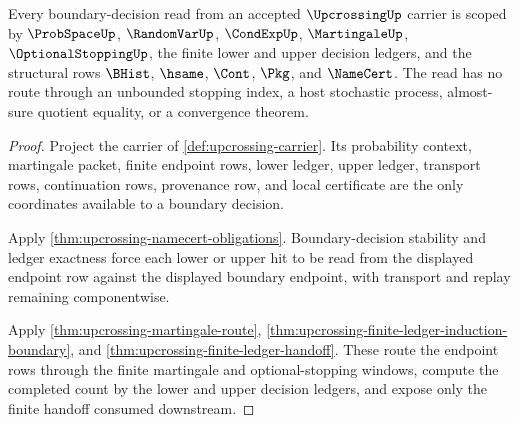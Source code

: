\begin{theorem}
\label{thm:upcrossing-scoped-decision-route}
Every boundary-decision read from an accepted $\UpcrossingUp$ carrier is scoped by $\ProbSpaceUp$, $\RandomVarUp$, $\CondExpUp$, $\MartingaleUp$, $\OptionalStoppingUp$, the finite lower and upper decision ledgers, and the structural rows $\BHist$, $\hsame$, $\Cont$, $\Pkg$, and $\NameCert$. The read has no route through an unbounded stopping index, a host stochastic process, almost-sure quotient equality, or a convergence theorem.
\end{theorem}
\begin{proof}
Project the carrier of \autoref{def:upcrossing-carrier}. Its probability context, martingale packet, finite endpoint rows, lower ledger, upper ledger, transport rows, continuation rows, provenance row, and local certificate are the only coordinates available to a boundary decision.

Apply \autoref{thm:upcrossing-namecert-obligations}. Boundary-decision stability and ledger exactness force each lower or upper hit to be read from the displayed endpoint row against the displayed boundary endpoint, with transport and replay remaining componentwise.

Apply \autoref{thm:upcrossing-martingale-route}, \autoref{thm:upcrossing-finite-ledger-induction-boundary}, and \autoref{thm:upcrossing-finite-ledger-handoff}. These route the endpoint rows through the finite martingale and optional-stopping windows, compute the completed count by the lower and upper decision ledgers, and expose only the finite handoff consumed downstream.
\end{proof}

